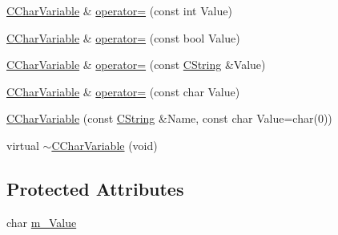 \begin{DoxyCompactItemize}
\item 
\hyperlink{classCCharVariable}{C\-Char\-Variable} \& \hyperlink{classCCharVariable_a6b23a1db0dc1c7e0f9b5d300afce1f39}{operator=} (const int Value)
\item 
\hyperlink{classCCharVariable}{C\-Char\-Variable} \& \hyperlink{classCCharVariable_ad462dd5286582fc983efd78fa0f9eb6b}{operator=} (const bool Value)
\item 
\hyperlink{classCCharVariable}{C\-Char\-Variable} \& \hyperlink{classCCharVariable_a2a898698c674e16474eaef2ebba5b3fc}{operator=} (const \hyperlink{classCString}{C\-String} \&Value)
\item 
\hyperlink{classCCharVariable}{C\-Char\-Variable} \& \hyperlink{classCCharVariable_a5067c8967f080401e47156c1745e954d}{operator=} (const char Value)
\item 
\hyperlink{classCCharVariable_a60d5255de8d6661ee6a195284f144c50}{C\-Char\-Variable} (const \hyperlink{classCString}{C\-String} \&Name, const char Value=char(0))
\item 
virtual \hyperlink{classCCharVariable_a8c8be62cf2960f61f0275c2b35d479a2}{$\sim$\-C\-Char\-Variable} (void)
\end{DoxyCompactItemize}
\subsection*{Protected Attributes}
\begin{DoxyCompactItemize}
\item 
char \hyperlink{classCCharVariable_a0e76b26ffd276425d7bf5fe80dd118f2}{m\-\_\-\-Value}
\end{DoxyCompactItemize}


